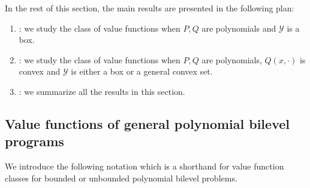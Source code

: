 \documentclass{article}
\newcommand*{\cY}{\mathcal{Y}}
\newcommand{\valoptim}{\varphi_o}
\newcommand{\valpessim}{\varphi_p}
\newcommand{\TL}[1]{\textcolor{red}{#1}}
\newcommand{\jer}[1]{[[\textcolor{magenta}{#1}]]}
\newcommand{\ed}[1]{\textcolor{blue}{ED: #1}}
\theoremstyle{plain}
\newtheorem{lemma}[theorem]{Lemma}
\theoremstyle{definition}
\begin{document}


  
{In the rest of this section, the main results are presented in the following plan:
\begin{enumerate}[leftmargin=*]
    \item {}: we study the class of value functions when $P,Q$ are polynomials and $\cY$ is a box.
    \item {}: we study the class of value functions when $P,Q$ are polynomials, $Q(x,\cdot)$ is convex and $\cY$ is either a box or a general convex set.
    \item {}: we summarize all the results in this section.
\end{enumerate}
}
\subsection{Value functions of general polynomial bilevel programs}
\label{subsection:closed-results}
We introduce the following notation which is a shorthand for value function classes for bounded or unbounded polynomial bilevel problems.
\end{document}
